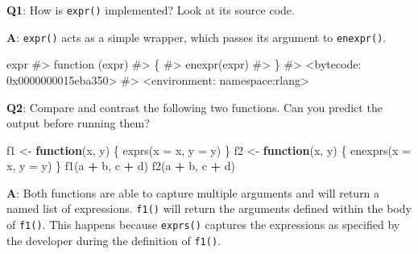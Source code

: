 \documentclass[
]{krantz}
\makeatletter
\newenvironment{Shaded}{\begin{snugshade}}{\end{snugshade}}
\newcommand{\CommentTok}[1]{\textcolor[rgb]{0.56,0.35,0.01}{\textit{#1}}}
\newcommand{\ControlFlowTok}[1]{\textcolor[rgb]{0.13,0.29,0.53}{\textbf{#1}}}
\newcommand{\DataTypeTok}[1]{\textcolor[rgb]{0.13,0.29,0.53}{#1}}
\newcommand{\KeywordTok}[1]{\textcolor[rgb]{0.13,0.29,0.53}{\textbf{#1}}}
\newcommand{\NormalTok}[1]{#1}
\newcommand{\OperatorTok}[1]{\textcolor[rgb]{0.81,0.36,0.00}{\textbf{#1}}}
\newcommand{\StringTok}[1]{\textcolor[rgb]{0.31,0.60,0.02}{#1}}
\newenvironment{kframe}{%
\medskip{}
\setlength{\fboxsep}{.8em}
 \def\at@end@of@kframe{}%
 \ifinner\ifhmode%
  \def\at@end@of@kframe{\end{minipage}}%
  \begin{minipage}{\columnwidth}%
 \fi\fi%
 \def\FrameCommand##1{\hskip\@totalleftmargin \hskip-\fboxsep
 \colorbox{shadecolor}{##1}\hskip-\fboxsep
     \hskip-\linewidth \hskip-\@totalleftmargin \hskip\columnwidth}%
 \MakeFramed {\advance\hsize-\width
   \@totalleftmargin\z@ \linewidth\hsize
   \@setminipage}}%
 {\par\unskip\endMakeFramed%
 \at@end@of@kframe}
\renewenvironment{Shaded}{\begin{kframe}}{\end{kframe}}
\renewcommand{\KeywordTok} [1]{\textcolor[rgb]{0.00,0.44,0.13}{{#1}}}
\renewcommand{\DataTypeTok}[1]{\textcolor[rgb]{0.56,0.13,0.00}{{#1}}}
\renewcommand{\StringTok}  [1]{\textcolor[rgb]{0.25,0.44,0.63}{{#1}}}
\renewcommand{\CommentTok} [1]{\textcolor[rgb]{0.38,0.63,0.69}{{#1}}}
\renewcommand{\NormalTok}  [1]{{#1}}
\makeatother
\begin{document}
\textbf{{Q1}}: How is \texttt{expr()} implemented? Look at its source code.

\textbf{{A}}: \texttt{expr()} acts as a simple wrapper, which passes its argument to \texttt{enexpr()}.

\begin{Shaded}
\begin{Highlighting}[]
\NormalTok{expr}
\CommentTok{#> function (expr) }
\CommentTok{#> \{}
\CommentTok{#>     enexpr(expr)}
\CommentTok{#> \}}
\CommentTok{#> <bytecode: 0x0000000015eba350>}
\CommentTok{#> <environment: namespace:rlang>}
\end{Highlighting}
\end{Shaded}

\textbf{{Q2}}: Compare and contrast the following two functions. Can you predict the output before running them?

\begin{Shaded}
\begin{Highlighting}[]
\NormalTok{f1 <-}\StringTok{ }\ControlFlowTok{function}\NormalTok{(x, y) \{}
  \KeywordTok{exprs}\NormalTok{(}\DataTypeTok{x =}\NormalTok{ x, }\DataTypeTok{y =}\NormalTok{ y)}
\NormalTok{\}}
\NormalTok{f2 <-}\StringTok{ }\ControlFlowTok{function}\NormalTok{(x, y) \{}
  \KeywordTok{enexprs}\NormalTok{(}\DataTypeTok{x =}\NormalTok{ x, }\DataTypeTok{y =}\NormalTok{ y)}
\NormalTok{\}}
\KeywordTok{f1}\NormalTok{(a }\OperatorTok{+}\StringTok{ }\NormalTok{b, c }\OperatorTok{+}\StringTok{ }\NormalTok{d)}
\KeywordTok{f2}\NormalTok{(a }\OperatorTok{+}\StringTok{ }\NormalTok{b, c }\OperatorTok{+}\StringTok{ }\NormalTok{d)}
\end{Highlighting}
\end{Shaded}

\textbf{{A}}: Both functions are able to capture multiple arguments and will return a named list of expressions. \texttt{f1()} will return the arguments defined within the body of \texttt{f1()}. This happens because \texttt{exprs()} captures the expressions as specified by the developer during the definition of \texttt{f1()}.

\begin{Shaded}
\end{Shaded}
\end{document}
